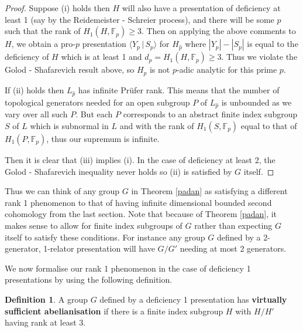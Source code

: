 \documentclass[11pt,reqno]{amsart}
\numberwithin{equation}{section}
\newcommand{\F}{\mathbb{F}}
\theoremstyle{definition}
\newtheorem{defn}[thm]{Definition}
\theoremstyle{remark}
\begin{document}
       \begin{proof}
         Suppose (i) holds then $H$ will also have a presentation of
         deficiency at least 1
     (say by the Reidemeister - Schreier process),
         and there will be some $p$
         such that the rank of $H_1(H,\F_p)\geq 3$.
         Then on applying the above comments to $H$, we obtain a pro-$p$
         presentation $\langle Y_p\,|\,S_p\rangle$ for $H_{\hat{p}}$ where
         $|Y_p|-|S_p|$ is equal to the deficiency of $H$ which is at least
         1 and $d_p=H_1(H,\F_p)\geq 3$.
         Thus we violate the Golod - Shafarevich result above, so
         $H_{\hat{p}}$ is not $p$-adic analytic for this prime $p$.

      If (ii) holds then $L_{\hat{p}}$ has infinite Pr\"ufer rank. This means
      that the number of topological generators needed for an open subgroup
      $P$ of $L_{\hat{p}}$ is unbounded as we vary over all such $P$.
      But each $P$ corresponds to an abstract
      finite index subgroup $S$ of $L$ which is subnormal in $L$ and with
      the rank of $H_1(S,\F_p)$ equal to that of $H_1(P,\F_p)$, thus our
supremum is infinite.

Then it is clear that (iii) implies (i). In the case of deficiency
at least 2, the Golod - Shafarevich inequality never holds so (ii) is
satisfied by $G$ itself.
\end{proof}

     Thus we can think of any group $G$ in Theorem \ref{padan}
     as satisfying a different rank 1 phenomenon to that of having
     infinite dimensional bounded second cohomology from the last section.
     Note that because of Theorem \ref{padan}, it makes sense to allow for
     finite index subgroups of $G$ rather than expecting $G$ itself to
     satisfy these conditions. For instance any group $G$ defined by a
     2-generator, 1-relator presentation will have $G/G'$ needing at most
     2 generators.

     We now formalise our rank 1 phenomenon in the case of deficiency 1
     presentations by using the following definition.

     \begin{defn} \label{vsa}
       A group $G$ defined by a deficiency 1 presentation
       has {\bf virtually sufficient abelianisation} if there is a finite index
       subgroup $H$ with $H/H'$ having rank at least 3.
     \end{defn}
\end{document}
